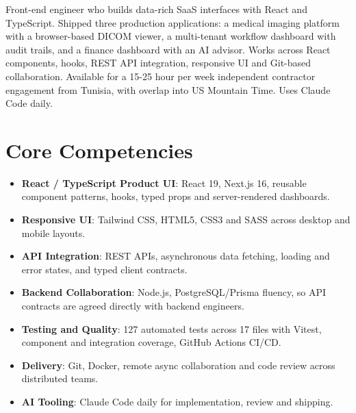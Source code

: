 \documentclass[11pt,a4paper,sans]{moderncv}
\begin{document}
\makecvtitle

\vspace{6pt}
\small{Front-end engineer who builds data-rich SaaS interfaces with React and TypeScript. Shipped three production applications: a medical imaging platform with a browser-based DICOM viewer, a multi-tenant workflow dashboard with audit trails, and a finance dashboard with an AI advisor. Works across React components, hooks, REST API integration, responsive UI and Git-based collaboration. Available for a 15-25 hour per week independent contractor engagement from Tunisia, with overlap into US Mountain Time. Uses Claude Code daily.}

\section{Core Competencies}
\vspace{1pt}
\begin{itemize}
\item \textbf{React / TypeScript Product UI}: React 19, Next.js 16, reusable component patterns, hooks, typed props and server-rendered dashboards.
\item \textbf{Responsive UI}: Tailwind CSS, HTML5, CSS3 and SASS across desktop and mobile layouts.
\item \textbf{API Integration}: REST APIs, asynchronous data fetching, loading and error states, and typed client contracts.
\item \textbf{Backend Collaboration}: Node.js, PostgreSQL/Prisma fluency, so API contracts are agreed directly with backend engineers.
\item \textbf{Testing and Quality}: 127 automated tests across 17 files with Vitest, component and integration coverage, GitHub Actions CI/CD.
\item \textbf{Delivery}: Git, Docker, remote async collaboration and code review across distributed teams.
\item \textbf{AI Tooling}: Claude Code daily for implementation, review and shipping.
\end{itemize}
\end{document}
